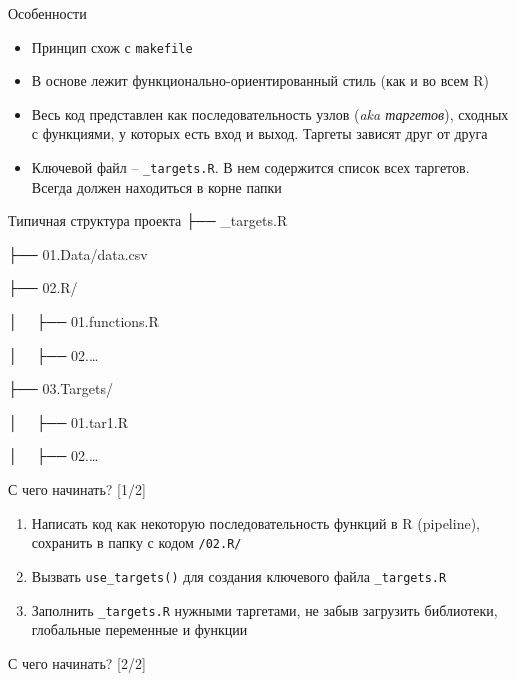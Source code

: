 \documentclass[
  ignorenonframetext,
]{beamer}
\providecommand{\tightlist}{%
  \setlength{\itemsep}{0pt}\setlength{\parskip}{0pt}}\usepackage{longtable,booktabs,array}
\begin{document}
\begin{frame}[fragile]{Особенности}
\label{ux43eux441ux43eux431ux435ux43dux43dux43eux441ux442ux438}
\begin{itemize}
\item
  Принцип схож с \texttt{makefile}
\item
  В основе лежит функционально-ориентированный стиль (как и во всем R)
\item
  Весь код представлен как последовательность узлов (\emph{aka
  таргетов}), сходных с функциями, у которых есть вход и выход. Таргеты
  зависят друг от друга
\item
  Ключевой файл -- \texttt{\_targets.R}. В нем содержится список всех
  таргетов. Всегда должен находиться в корне папки
\end{itemize}
\end{frame}

\begin{frame}{Типичная структура проекта}
\label{ux442ux438ux43fux438ux447ux43dux430ux44f-ux441ux442ux440ux443ux43aux442ux443ux440ux430-ux43fux440ux43eux435ux43aux442ux430}
├── \_targets.R

├── 01.Data/data.csv

├── 02.R/

│~~ ├── 01.functions.R

│~~ ├── 02.\ldots{}

├── 03.Targets/

│~~ ├── 01.tar1.R

│~~ ├── 02.\ldots{}
\end{frame}

\begin{frame}[fragile]{С чего начинать? {[}1/2{]}}
\label{ux441-ux447ux435ux433ux43e-ux43dux430ux447ux438ux43dux430ux442ux44c-12}
\begin{enumerate}
\item
  Написать код как некоторую последовательность функций в R (pipeline),
  сохранить в папку с кодом \texttt{/02.R/}
\item
  Вызвать \texttt{use\_targets()} для создания ключевого файла
  \texttt{\_targets.R}
\item
  Заполнить \texttt{\_targets.R} нужными таргетами, не забыв загрузить
  библиотеки, глобальные переменные и функции
\end{enumerate}
\end{frame}

\begin{frame}[fragile]{С чего начинать? {[}2/2{]}}
\label{ux441-ux447ux435ux433ux43e-ux43dux430ux447ux438ux43dux430ux442ux44c-22}
\end{frame}
\end{document}
